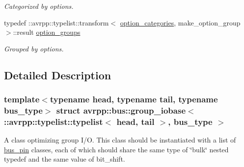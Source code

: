 \begin{DoxyCompactItemize}
\begin{DoxyCompactList}\small\item\em Categorized by options. \item\end{DoxyCompactList}\item 
typedef ::avrpp::typelist::transform$<$ \hyperlink{structavrpp_1_1bus_1_1group__iobase_3_01_1_1avrpp_1_1typelist_1_1typelist_3_01head_00_01tail_01_4_00_01bus__type_01_4_a1aff854df5990b5d460cd2431a29527b}{option\_\-categories}, make\_\-option\_\-group $>$::result \hyperlink{structavrpp_1_1bus_1_1group__iobase_3_01_1_1avrpp_1_1typelist_1_1typelist_3_01head_00_01tail_01_4_00_01bus__type_01_4_ac3e03bebeadefc2d2c4ad6a0b6b49899}{option\_\-groups}
\begin{DoxyCompactList}\small\item\em Grouped by options. \item\end{DoxyCompactList}\end{DoxyCompactItemize}


\subsection{Detailed Description}
\subsubsection*{template$<$typename head, typename tail, typename bus\_\-type$>$ struct avrpp::bus::group\_\-iobase$<$ ::avrpp::typelist::typelist$<$ head, tail $>$, bus\_\-type $>$}

A class optimizing group I/O. This class should be instantiated with a list of \hyperlink{structavrpp_1_1bus_1_1bus__pin}{bus\_\-pin} classes, each of which should share the same type of \char`\"{}bulk\char`\"{} nested typedef and the same value of bit\_\-shift. 

